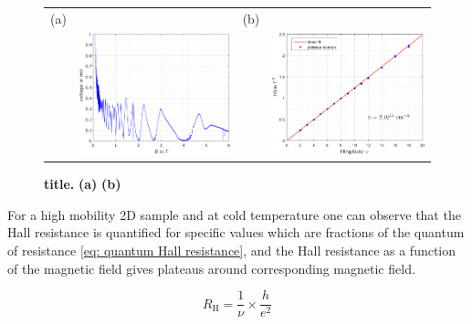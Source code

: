 \begin{figure}[hptb]
	\begin{center}
		\begin{tabular}{c c c c}
			(a) & & (b) & \\
			& \includegraphics[width = 6.5 cm]{./chap2/backscattered_current} &
			& \includegraphics[width = 6.5 cm]{./chap2/B_vs_nu}
		\end{tabular}
	\end{center}
	
	\caption{\textbf{title.} \textbf{(a)}  \textbf{(b)}}
	\label{fig: backscattered current}
\end{figure}

For a high mobility 2D sample and at cold temperature one can observe that the Hall resistance is quantified for specific values which are fractions of the quantum of resistance \eqref{eq: quantum Hall resistance}, and the Hall resistance as a function of the magnetic field gives plateaus around corresponding magnetic field.

\begin{equation}
R_{\mathrm{H}} = \frac{1}{\nu}\times\frac{h}{e^{2}} \label{eq: quantum Hall resistance}
\end{equation}

